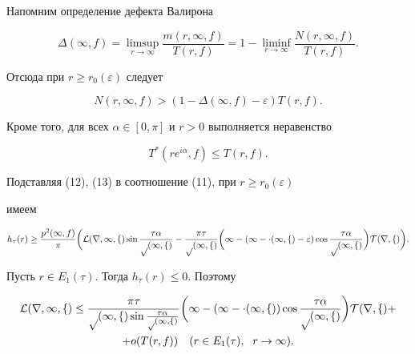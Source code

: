  


Напомним определение дефекта Валирона 


$$ 


\Delta(\infty,f)=\limsup_{r\to\infty} 


\frac{m(r,\infty,f)}{T(r,f)}= 


1-\liminf_{r\to\infty}\frac{N(r,\infty,f)}{T(r,f)}. 


$$ 


Отсюда при $r\ge r_0(\varepsilon)$ следует 


\begin{equation} 


N(r,\infty,f)>(1-\Delta(\infty,f)-\varepsilon)T(r,f). 


\end{equation} 


Кроме того, для всех $\alpha\in[0,\pi]$ и $r>0$ выполняется неравенство 


\begin{equation} 


T^*(r e^{i\alpha},f)\le T(r,f). 


\end{equation} 


Подставляя (12), (13) в соотношение (11), при $r\ge r_0(\varepsilon)$ 


имеем 


$$ 


h_\tau(r)\ge\frac{p^2(\infty,f)}{\pi}\bigg( 


\cal L(r,\infty,f)\sin\frac{\tau\alpha}{p(\infty,f)}- 


\frac{\pi\tau}{p(\infty,f)}\bigg(1-(1-\Delta(\infty,f)-\varepsilon)


\cos \frac{\tau\alpha}{p(\infty,f)}\bigg)T(r,f)\bigg). 


$$ 


Пусть $r\in E_1(\tau)$. Тогда $h_\tau(r)\le0$. Поэтому 


\begin{multline} 


\cal L(r,\infty,f)\le 


\frac{\pi\tau}{p(\infty,f)\sin\frac{\tau\alpha}{p(\infty,f)}} 


\bigg(1-(1-\Delta(\infty,f))\cos\frac{\tau\alpha}{p(\infty,f)} 


\bigg)T(r,f)+\\


%


+o(T(r,f))\quad (r\in E_1(\tau),\ \; r\to\infty). 


\end{multline} 


